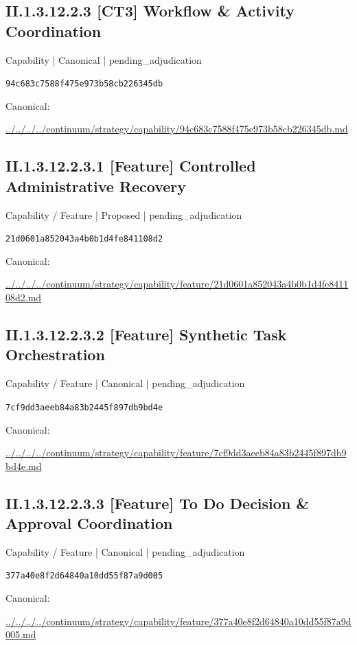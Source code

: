 \documentclass[10pt,a4paper]{article}
\begin{document}
\subsection*{II.1.3.12.2.3 [CT3] Workflow \& Activity Coordination}
{\small Capability | Canonical | pending\_adjudication}\par
\texttt{94c683c7588f475e973b58cb226345db}\par
Canonical: \par
{\footnotesize\url{../../../../continuum/strategy/capability/94c683c7588f475e973b58cb226345db.md}}\par
\subsection*{II.1.3.12.2.3.1 [Feature] Controlled Administrative Recovery}
{\small Capability / Feature | Proposed | pending\_adjudication}\par
\texttt{21d0601a852043a4b0b1d4fe841108d2}\par
Canonical: \par
{\footnotesize\url{../../../../continuum/strategy/capability/feature/21d0601a852043a4b0b1d4fe841108d2.md}}\par
\subsection*{II.1.3.12.2.3.2 [Feature] Synthetic Task Orchestration}
{\small Capability / Feature | Canonical | pending\_adjudication}\par
\texttt{7cf9dd3aeeb84a83b2445f897db9bd4e}\par
Canonical: \par
{\footnotesize\url{../../../../continuum/strategy/capability/feature/7cf9dd3aeeb84a83b2445f897db9bd4e.md}}\par
\subsection*{II.1.3.12.2.3.3 [Feature] To Do Decision \& Approval Coordination}
{\small Capability / Feature | Canonical | pending\_adjudication}\par
\texttt{377a40e8f2d64840a10dd55f87a9d005}\par
Canonical: \par
{\footnotesize\url{../../../../continuum/strategy/capability/feature/377a40e8f2d64840a10dd55f87a9d005.md}}\par
\end{document}

